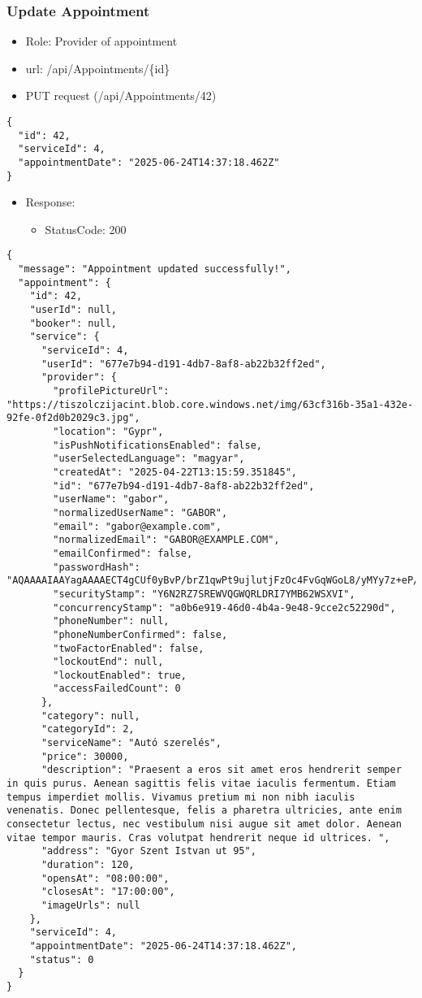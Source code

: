 \documentclass[11pt]{article}
\begin{document}
\subsubsection{Update Appointment}
\label{sec:org48362f8}
\begin{itemize}
\item Role: Provider of appointment
\item url: /api/Appointments/\{id\}
\item PUT request (/api/Appointments/42)
\end{itemize}
\begin{verbatim}
{
  "id": 42,
  "serviceId": 4,
  "appointmentDate": "2025-06-24T14:37:18.462Z"
}
\end{verbatim}
\begin{itemize}
\item Response:
\begin{itemize}
\item StatusCode: 200
\end{itemize}
\end{itemize}
\begin{verbatim}
{
  "message": "Appointment updated successfully!",
  "appointment": {
    "id": 42,
    "userId": null,
    "booker": null,
    "service": {
      "serviceId": 4,
      "userId": "677e7b94-d191-4db7-8af8-ab22b32ff2ed",
      "provider": {
        "profilePictureUrl": "https://tiszolczijacint.blob.core.windows.net/img/63cf316b-35a1-432e-92fe-0f2d0b2029c3.jpg",
        "location": "Gypr",
        "isPushNotificationsEnabled": false,
        "userSelectedLanguage": "magyar",
        "createdAt": "2025-04-22T13:15:59.351845",
        "id": "677e7b94-d191-4db7-8af8-ab22b32ff2ed",
        "userName": "gabor",
        "normalizedUserName": "GABOR",
        "email": "gabor@example.com",
        "normalizedEmail": "GABOR@EXAMPLE.COM",
        "emailConfirmed": false,
        "passwordHash": "AQAAAAIAAYagAAAAECT4gCUf0yBvP/brZ1qwPt9ujlutjFzOc4FvGqWGoL8/yMYy7z+eP/0E/Qqe1jIcJQ==",
        "securityStamp": "Y6N2RZ7SREWVQGWQRLDRI7YMB62WSXVI",
        "concurrencyStamp": "a0b6e919-46d0-4b4a-9e48-9cce2c52290d",
        "phoneNumber": null,
        "phoneNumberConfirmed": false,
        "twoFactorEnabled": false,
        "lockoutEnd": null,
        "lockoutEnabled": true,
        "accessFailedCount": 0
      },
      "category": null,
      "categoryId": 2,
      "serviceName": "Autó szerelés",
      "price": 30000,
      "description": "Praesent a eros sit amet eros hendrerit semper in quis purus. Aenean sagittis felis vitae iaculis fermentum. Etiam tempus imperdiet mollis. Vivamus pretium mi non nibh iaculis venenatis. Donec pellentesque, felis a pharetra ultricies, ante enim consectetur lectus, nec vestibulum nisi augue sit amet dolor. Aenean vitae tempor mauris. Cras volutpat hendrerit neque id ultrices. ",
      "address": "Gyor Szent Istvan ut 95",
      "duration": 120,
      "opensAt": "08:00:00",
      "closesAt": "17:00:00",
      "imageUrls": null
    },
    "serviceId": 4,
    "appointmentDate": "2025-06-24T14:37:18.462Z",
    "status": 0
  }
}
\end{verbatim}
\end{document}
